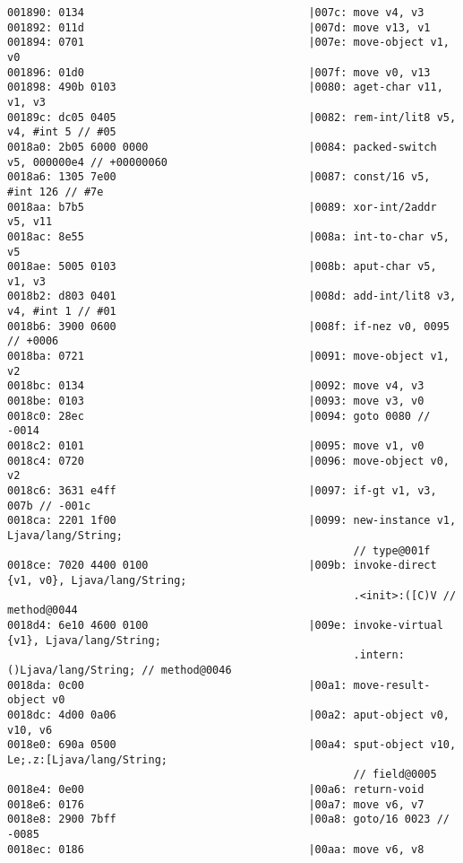 \begin{lstlisting}
001890: 0134                                   |007c: move v4, v3
001892: 011d                                   |007d: move v13, v1
001894: 0701                                   |007e: move-object v1, v0
001896: 01d0                                   |007f: move v0, v13
001898: 490b 0103                              |0080: aget-char v11, v1, v3
00189c: dc05 0405                              |0082: rem-int/lit8 v5, v4, #int 5 // #05
0018a0: 2b05 6000 0000                         |0084: packed-switch v5, 000000e4 // +00000060
0018a6: 1305 7e00                              |0087: const/16 v5, #int 126 // #7e
0018aa: b7b5                                   |0089: xor-int/2addr v5, v11
0018ac: 8e55                                   |008a: int-to-char v5, v5
0018ae: 5005 0103                              |008b: aput-char v5, v1, v3
0018b2: d803 0401                              |008d: add-int/lit8 v3, v4, #int 1 // #01
0018b6: 3900 0600                              |008f: if-nez v0, 0095 // +0006
0018ba: 0721                                   |0091: move-object v1, v2
0018bc: 0134                                   |0092: move v4, v3
0018be: 0103                                   |0093: move v3, v0
0018c0: 28ec                                   |0094: goto 0080 // -0014
0018c2: 0101                                   |0095: move v1, v0
0018c4: 0720                                   |0096: move-object v0, v2
0018c6: 3631 e4ff                              |0097: if-gt v1, v3, 007b // -001c
0018ca: 2201 1f00                              |0099: new-instance v1, Ljava/lang/String;
                                                      // type@001f
0018ce: 7020 4400 0100                         |009b: invoke-direct {v1, v0}, Ljava/lang/String;
                                                      .<init>:([C)V // method@0044
0018d4: 6e10 4600 0100                         |009e: invoke-virtual {v1}, Ljava/lang/String;
                                                      .intern:()Ljava/lang/String; // method@0046
0018da: 0c00                                   |00a1: move-result-object v0
0018dc: 4d00 0a06                              |00a2: aput-object v0, v10, v6
0018e0: 690a 0500                              |00a4: sput-object v10, Le;.z:[Ljava/lang/String;
                                                      // field@0005
0018e4: 0e00                                   |00a6: return-void
0018e6: 0176                                   |00a7: move v6, v7
0018e8: 2900 7bff                              |00a8: goto/16 0023 // -0085
0018ec: 0186                                   |00aa: move v6, v8

\end{lstlisting}
